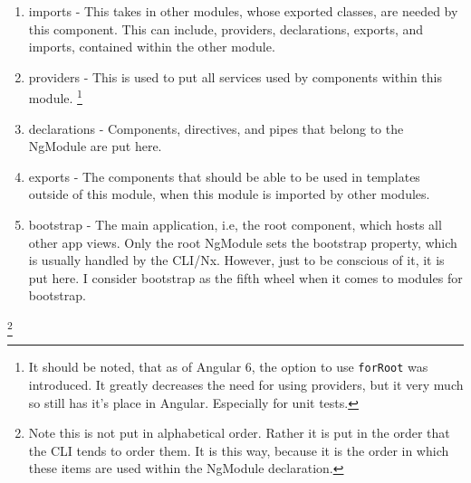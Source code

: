 \begin{enumerate}
  \item imports - This takes in other modules, whose exported classes, are
  needed by this component. This can include, providers, declarations, exports,
  and imports, contained within the other module.
  \item providers - This is used to put all services used by components within
  this module. \footnote{It should be noted, that as of Angular 6, the option
  to use \lstinline{forRoot} was introduced. It greatly decreases the need for
  using providers, but it very much so still has it's place in Angular.
  Especially for unit tests.}
  \item declarations - Components, directives, and pipes that belong to the
  NgModule are put here.
  \item exports - The components that should be able to be used in templates
  outside of this module, when this module is imported by other modules.
  \item bootstrap - The main application, i.e, the root component, which hosts
  all other app views. Only the root NgModule sets the bootstrap property,
  which is usually handled by the CLI/Nx. However, just to be conscious of it,
  it is put here. I consider bootstrap as the fifth wheel when it comes to
  modules for bootstrap.
\end{enumerate}
\footnote{Note this is not put in alphabetical order. Rather it is put in the
order that the CLI tends to order them. It is this way, because it is the order
in which these items are used within the NgModule declaration.}